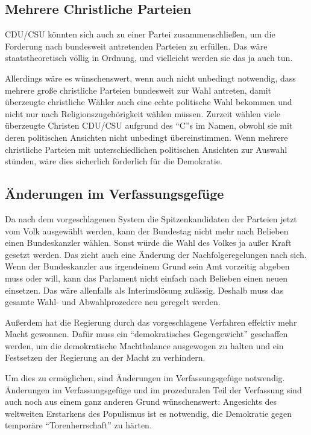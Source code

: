 \clearpage
\subsection{Mehrere Christliche Parteien}

CDU/CSU könnten sich auch zu einer Partei zusammenschließen, um die Forderung nach bundesweit
antretenden Parteien zu erfüllen.
Das wäre staatstheoretisch völlig in Ordnung, und vielleicht werden sie das ja auch tun.

Allerdings wäre es wünschenswert, wenn auch nicht unbedingt notwendig, dass mehrere große
christliche Parteien bundesweit zur Wahl antreten, damit überzeugte christliche Wähler auch eine
echte politische Wahl bekommen und nicht nur nach Religionszugehörigkeit wählen müssen.
Zurzeit wählen viele überzeugte Christen CDU/CSU aufgrund des \enquote{C}s im Namen, obwohl sie mit
deren politischen Ansichten nicht unbedingt übereinstimmen.
Wenn mehrere christliche Parteien mit unterschiedlichen politischen Ansichten zur Auswahl stünden, wäre dies sicherlich förderlich für
die Demokratie.

\subsection{Änderungen im Verfassungsgefüge}

Da nach dem vorgeschlagenen System die Spitzenkandidaten der Parteien jetzt vom Volk ausgewählt werden, kann der Bundestag nicht mehr nach Belieben einen Bundeskanzler wählen.
Sonst würde die Wahl des Volkes ja außer Kraft gesetzt werden.
Das zieht auch eine Änderung der Nachfolgeregelungen nach sich.
Wenn der Bundeskanzler aus irgendeinem Grund sein Amt vorzeitig abgeben muss oder will, kann das Parlament nicht einfach nach Belieben einen neuen einsetzen.
Das wäre allenfalls als Interimslösung zulässig.
Deshalb muss das gesamte Wahl- und Abwahlprozedere neu geregelt werden.

Außerdem hat die Regierung durch das vorgeschlagene Verfahren effektiv mehr Macht gewonnen.
Dafür muss ein \enquote{demokratisches Gegengewicht} geschaffen werden, um die demokratische Machtbalance ausgewogen zu halten und ein Festsetzen der Regierung an der Macht zu verhindern.

Um dies zu ermöglichen, sind Änderungen im Verfassungsgefüge notwendig.
Änderungen im Verfassungsgefüge und im prozeduralen Teil der Verfassung sind auch noch aus einem ganz anderen Grund wünschenswert: Angesichts des weltweiten Erstarkens des Populismus ist es notwendig, die Demokratie gegen temporäre \enquote{Torenherrschaft} zu härten.

